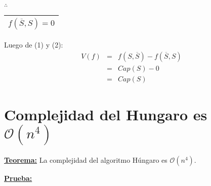 \documentclass[12pt,a4paper]{report}
\begin{document}
\begin{enumerate}[(1)]
							\vspace{3mm}
							\par $\therefore$ \begin{tabular}{|c|} \hline $ f(\overline{S}, S) = 0 $ \\\hline \end{tabular}
					\end{enumerate}

					\par Luego de (1) y (2):
					\begin{eqnarray}
						\nonumber V(f) &=& f(S, \overline{S}) - f(\overline{S}, S)\\
						\nonumber &=& Cap(S) - 0 \\
						\nonumber &=& Cap(S)
					\end{eqnarray}


	\section{Complejidad del Hungaro es $\mathcal{O}(n^{4})$}
		\textbf{\underline{Teorema:}} La complejidad del algoritmo Húngaro es $\mathcal{O}(n^{4})$.

		\textbf{\underline{Prueba:}}
\end{document}
